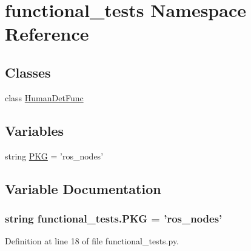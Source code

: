 \hypertarget{namespacefunctional__tests}{\section{functional\-\_\-tests Namespace Reference}
\label{namespacefunctional__tests}
}
\subsection*{Classes}
\begin{DoxyCompactItemize}
\item 
class \hyperlink{classfunctional__tests_1_1HumanDetFunc}{Human\-Det\-Func}
\end{DoxyCompactItemize}
\subsection*{Variables}
\begin{DoxyCompactItemize}
\item 
string \hyperlink{namespacefunctional__tests_a78507f367d6307db1c1633379cbccc35}{P\-K\-G} = 'ros\-\_\-nodes'
\end{DoxyCompactItemize}


\subsection{Variable Documentation}
\hypertarget{namespacefunctional__tests_a78507f367d6307db1c1633379cbccc35}{
\subsubsection[{P\-K\-G}]{\setlength{\rightskip}{0pt plus 5cm}string functional\-\_\-tests.\-P\-K\-G = 'ros\-\_\-nodes'}}\label{namespacefunctional__tests_a78507f367d6307db1c1633379cbccc35}


Definition at line 18 of file functional\-\_\-tests.\-py.

